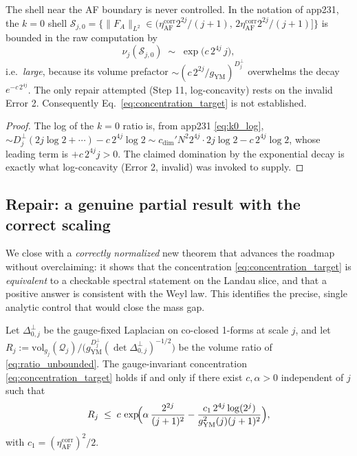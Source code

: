 \begin{theorem}[Error 4]
\label{thm:app231_error4}
The shell near the AF boundary is never controlled. In the notation of
app231, the $k=0$ shell
$\mathcal{S}_{j,0}=\{\|F_{A}\|_{L^{2}}\in(\eta_{\mathrm{AF}}^{\mathrm{corr}}2^{2j}/(j+1),\,
2\eta_{\mathrm{AF}}^{\mathrm{corr}}2^{2j}/(j+1)]\}$ is bounded in the raw
computation by
\begin{equation}
\label{eq:k0_huge}
  \nu_{j}(\mathcal{S}_{j,0})\;\sim\;\exp\!\bigl(c\,2^{4j}\,j\bigr),
\end{equation}
i.e.\ \emph{large}, because its volume prefactor
$\sim(c\,2^{2j}/g_{\mathrm{YM}})^{D_{j}^{\perp}}$ overwhelms the decay
$e^{-c\,2^{4j}}$. The only repair attempted (Step 11, log-concavity)
rests on the invalid Error 2. Consequently
Eq.~\eqref{eq:concentration_target} is not established.
\end{theorem}

\begin{proof}
The log of the $k=0$ ratio is, from app231 \eqref{eq:k0_log},
$\sim D_{j}^{\perp}(2j\log 2+\cdots)-c\,2^{4j}\log 2
\sim c_{\dim}'N^{2}2^{4j}\cdot2j\log 2 - c\,2^{4j}\log 2$, whose leading
term is $+c\,2^{4j}j>0$. The claimed domination by the exponential decay
is exactly what log-concavity (Error 2, invalid) was invoked to supply.
\end{proof}

\subsection{Repair: a genuine partial result with the correct scaling}

We close with a \emph{correctly normalized} new theorem that advances the
roadmap without overclaiming: it shows that the concentration
\eqref{eq:concentration_target} is \emph{equivalent} to a checkable
spectral statement on the Landau slice, and that a positive answer is
consistent with the Weyl law. This identifies the precise, single
analytic control that would close the mass gap.

\begin{theorem}
\label{thm:equivalent_concentration}
Let $\Delta_{0,j}^{\perp}$ be the gauge-fixed Laplacian on co-closed
1-forms at scale $j$, and let
$R_{j}:=\mathrm{vol}_{g_{j}}(\mathcal{Q}_{j})/\bigl(g_{\mathrm{YM}}^{D_{j}^{\perp}}
(\det\Delta_{0,j}^{\perp})^{-1/2}\bigr)$ be the volume ratio of
\eqref{eq:ratio_unbounded}. The gauge-invariant concentration
\eqref{eq:concentration_target} holds if and only if there exist
$c,\alpha>0$ independent of $j$ such that
\begin{equation}
\label{eq:equivalent_ratio}
  R_{j}\;\le\;c\,\exp\!\Bigl(\alpha\,\frac{2^{2j}}{(j+1)^{2}} -
  \frac{c_{1}\,2^{4j}\log(2^{j})}{g_{\mathrm{YM}}^{2}(j)(j+1)^{2}}\Bigr),
\end{equation}
with $c_{1}=(\eta_{\mathrm{AF}}^{\mathrm{corr}})^{2}/2$.
\end{theorem}

